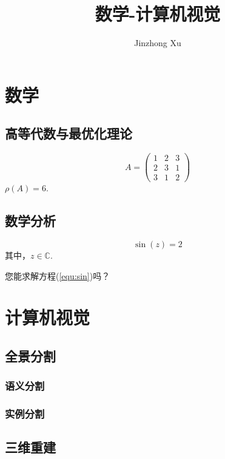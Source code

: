 \documentclass{article}
\title{数学-计算机视觉}
\author{Jinzhong Xu}
\begin{document}
\maketitle

\tableofcontents
\newpage


\section{数学}

\subsection{高等代数与最优化理论}


$$
A =
\begin{pmatrix}
	1 & 2 & 3 \\
	2 & 3 & 1 \\
	3 & 1 & 2
\end{pmatrix}
$$
$\rho(A) = 6$.

\subsection{数学分析}

\begin{equation}\label{equ:sin}
\sin(z) = 2
\end{equation}
其中，$z\in \mathbb{C}$.

您能求解方程(\ref{equ:sin})吗？

\section{计算机视觉}

\subsection[Panoptic Segmentation]{全景分割}

\subsubsection{语义分割}

\subsubsection{实例分割}

\subsection[3D Reconstruction]{三维重建}
\end{document}
